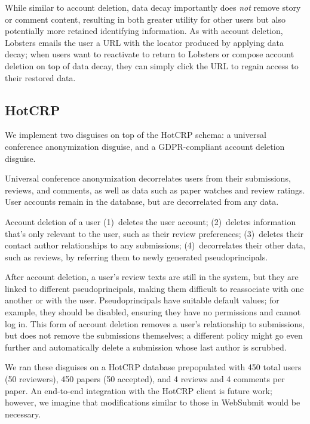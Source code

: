 While similar to account deletion, data decay importantly does \emph{not} remove story or comment
content, resulting in both greater utility for other users but also potentially more retained
identifying information.  As with account deletion, Lobsters emails the user a URL with the locator
produced by applying data decay; when users want to reactivate to return to Lobsters or compose
account deletion on top of data decay, they can simply click the URL to regain access to their
restored data.

\subsection{HotCRP}
We implement two disguises on top of the HotCRP schema: a universal conference anonymization disguise, and a
GDPR-compliant account deletion disguise.

Universal conference anonymization decorrelates users from their submissions, reviews, and comments,
as well as data such as paper watches and review ratings. User accounts remain in the database, but
are decorrelated from any data.

 Account deletion of a user 
%
(1)~deletes the user account;
%
(2)~deletes information that's only relevant to the user, such as their review preferences;
%
(3)~deletes their contact author relationships to any submissions;
%
(4)~decorrelates their other data, such as reviews, by referring them to newly generated pseudoprincipals.

After account deletion, a user's review texts are still in the system, but they are linked to
different pseudoprincipals, making them difficult to reassociate with one another or with the user.
%
Pseudoprincipals have suitable default values; for example, they should be disabled, ensuring they
have no permissions and cannot log in.
%
This form of account deletion removes a user's relationship to submissions, but does not remove the
submissions themselves; a different policy might go even further and automatically delete a
submission whose last author is scrubbed.

We ran these disguises on a HotCRP database prepopulated with 450 total users (50 reviewers), 450 papers
(50 accepted), and 4 reviews and 4 comments per paper. 
An end-to-end integration with the HotCRP client is future work; however, we imagine that
modifications similar to those in WebSubmit would be necessary.
